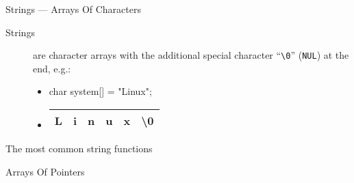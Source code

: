 \begin{frame}{Strings --- Arrays Of Characters}
  \begin{description}
  \item[Strings] are \alert{character arrays} with the additional special character
    ``\texttt{\textbackslash0}'' (\texttt{NUL}) at the end, e.g.:
    \ttfamily
    \begin{itemize}
    \item[] char system[] = "Linux";
    \item[] \begin{tabular}{*{6}{|c}|} \hline
              L&i&n&u&x&\textbackslash0\\\hline
            \end{tabular}
          \end{itemize}
  \end{description}
  \begin{iblock}{The most common string functions}
  \end{iblock}
\end{frame}

\begin{frame}{Arrays Of Pointers}
  \begin{center}
  \end{center}
\end{frame}

